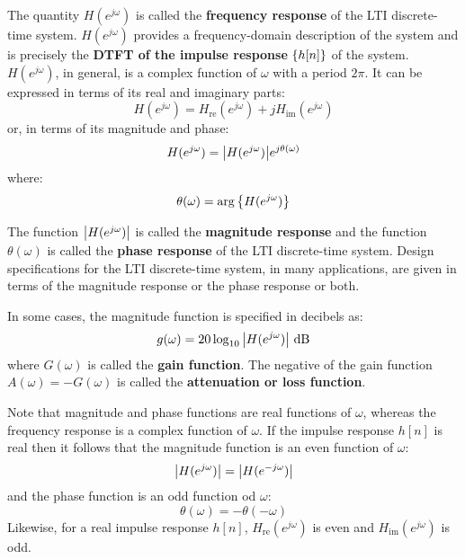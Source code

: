 \documentclass[../../main/main.tex]{subfiles}
\begin{document}
The quantity \( H(e^{j\omega}) \) is called the \textbf{frequency response} of the LTI discrete-time system. \( H(e^{j\omega}) \) provides a frequency-domain description of the system and is precisely the \textbf{DTFT of the impulse response} \( \qty{h[n]} \) of the system.
\( H(e^{j\omega}) \), in general, is a complex function of \( \omega \) with a period \( 2\pi \). It can be expressed in terms of its real and imaginary parts:
\begin{equation}
    H(e^{j\omega})
    =
    H_{\mathrm{re}}(e^{j\omega}) + j H_{\mathrm{im}}(e^{j\omega})
    \label{eq:L09_S36_1}
\end{equation}
or, in terms of its magnitude and phase:
\begin{equation}
    H(e^{j\omega})
    =
    \abs{H(e^{j\omega})} e^{j\theta(\omega)}
    \label{eq:L09_S36_2}
\end{equation}
where:
\begin{equation}
    \theta(\omega)
    =
    \arg\qty{H(e^{j\omega})}
    \label{eq:L09_S36_3}
\end{equation}

The function \( \abs{H(e^{j\omega})} \) is called the \textbf{magnitude response} and the function \( \theta(\omega) \) is called the \textbf{phase response} of the LTI discrete-time system. Design specifications for the LTI discrete-time system, in many applications, are given in terms of the magnitude response or the phase response or both.

In some cases, the magnitude function is specified in decibels as:
\begin{equation}
    g(\omega)
    =
    20 \log_{10} \abs{H(e^{j\omega})} \ \si{dB}
    \label{eq:L09_S38_1}
\end{equation}
where \( G(\omega) \) is called the \textbf{gain function}. The negative of the gain function \( A(\omega) = - G(\omega) \) is called the \textbf{attenuation or loss function}.

Note that magnitude and phase functions are real functions of \( \omega \), whereas the frequency response is a complex function of \( \omega \). If the impulse response \( h[n] \) is real then it follows that the magnitude function is an even function of \( \omega \):
\begin{equation}
    \abs{H(e^{j\omega})}
    =
    \abs{H(e^{-j\omega})}
    \label{eq:L09_S39_1}
\end{equation}
and the phase function is an odd function od \( \omega \):
\begin{equation}
    \theta(\omega)
    =
    - \theta(-\omega)
    \label{eq:L09_S39_2}
\end{equation}
Likewise, for a real impulse response \( h[n] \), \( H_{\mathrm{re}}(e^{j\omega}) \) is even and \( H_{\mathrm{im}}(e^{j\omega}) \) is odd.
\end{document}

